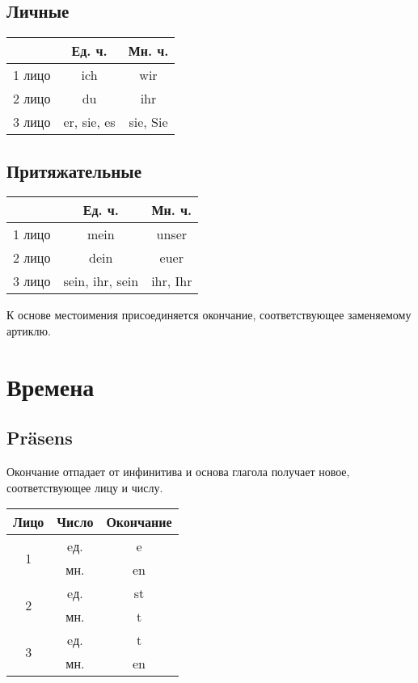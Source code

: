 \documentclass[oneside]{book}
\begin{document}
	\section{Личные}
	\begin{center}
		\begin{tabular}{|c|c|c|}
			\hline
				   & Ед. ч.      & Мн. ч.   \\ \hline
			1 лицо & ich         & wir      \\ \hline
			2 лицо & du          & ihr      \\ \hline
			3 лицо & er, sie, es & sie, Sie \\ \hline
		\end{tabular}
	\end{center}

	\section{Притяжательные}
	\begin{center}
		\begin{tabular}{|c|c|c|}
			\hline
			       & Ед. ч.          & Мн. ч.   \\ \hline
			1 лицо & mein            & unser    \\ \hline
			2 лицо & dein            & euer     \\ \hline
			3 лицо & sein, ihr, sein & ihr, Ihr \\ \hline
		\end{tabular}
	\end{center}

	К основе местоимения присоединяется окончание, соответствующее
	заменяемому артиклю.

	\chapter{Времена}
	\section{Pr\"asens}
	Окончание отпадает от инфинитива и основа глагола
	получает новое, соответствующее лицу и числу.

	\begin{center}
		\begin{tabular}{|c|c|c|}
			\hline
			Лицо               & Число & Окончание \\ \hline
			\multirow{2}{*}{1} & eд.   & e         \\ \cline{2-3}
			                   & мн.   & en        \\ \hline
			\multirow{2}{*}{2} & eд.   & st         \\ \cline{2-3}
			                   & мн.   & t        \\ \hline
			\multirow{2}{*}{3} & eд.   & t         \\ \cline{2-3}
			                   & мн.   & en        \\ \hline
		\end{tabular}
	\end{center}
\end{document}
